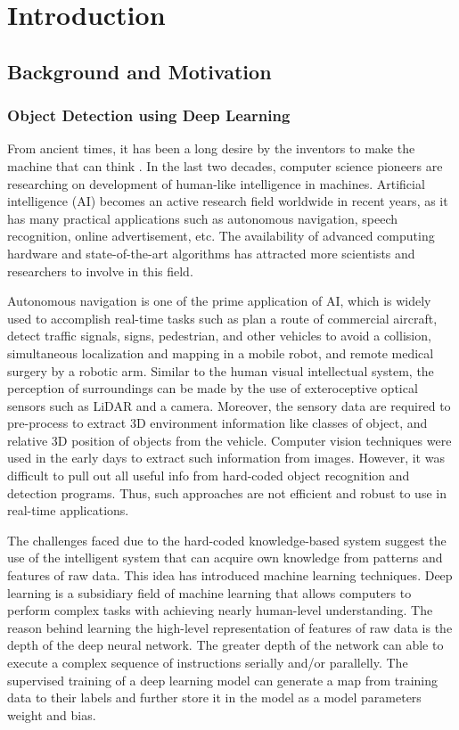 \chapter{Introduction}
\label{ch:intro}

\section{Background and Motivation}

\subsection{Object Detection using Deep Learning}
From ancient times, it has been a long desire by the inventors to make the machine that can think \cite{goodfellow}. In the last two decades, computer science pioneers are researching on development of human-like intelligence in machines. Artificial intelligence (AI) becomes an active research field worldwide in recent years, as it has many practical applications such as autonomous navigation, speech recognition, online advertisement, etc. The availability of advanced computing hardware and state-of-the-art algorithms has attracted more scientists and researchers to involve in this field. 

Autonomous navigation is one of the prime application of AI, which is widely used to accomplish real-time tasks such as plan a route of commercial aircraft, detect traffic signals, signs, pedestrian, and other vehicles to avoid a collision, simultaneous localization and mapping in a mobile robot, and remote medical surgery by a robotic arm. Similar to the human visual intellectual system, the perception of surroundings can be made by the use of exteroceptive optical sensors such as LiDAR and a camera. Moreover, the sensory data are required to pre-process to extract 3D environment information like classes of object, and relative 3D position of objects from the vehicle. Computer vision techniques were used in the early days to extract such information from images. However, it was difficult to pull out all useful info from hard-coded object recognition and detection programs. Thus, such approaches are not efficient and robust to use in real-time applications.

The challenges faced due to the hard-coded knowledge-based system suggest the use of the intelligent system that can acquire own knowledge from patterns and features of raw data. This idea has introduced machine learning techniques. Deep learning is a subsidiary field of machine learning that allows computers to perform complex tasks with achieving nearly human-level understanding. The reason behind learning the high-level representation of features of raw data is the depth of the deep neural network. The greater depth of the network can able to execute a complex sequence of instructions serially and/or parallelly. The supervised training of a deep learning model can generate a map from training data to their labels and further store it in the model as a model parameters weight and bias.  

